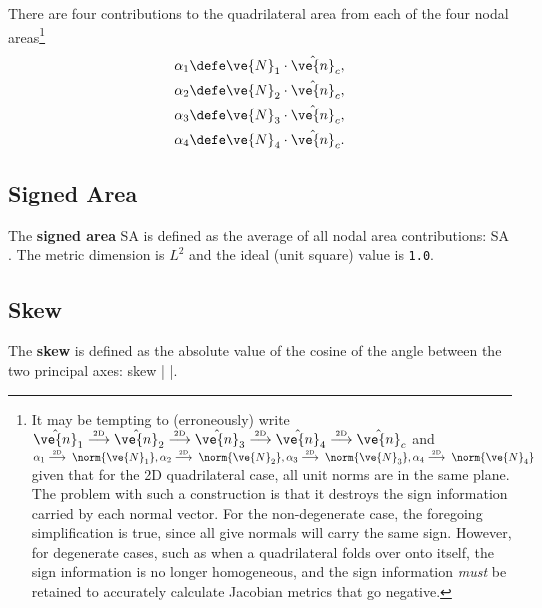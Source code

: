 \documentclass[14pt,letterpaper,fleqn]{extreport}
\begin{document}
There are four contributions to the quadrilateral area from each of the four nodal areas\footnote{\label{footnote:admonishment} It may be tempting to (erroneously) write
 $\hat{\ve{n}}_1 
 \overset{\tiny \mbox{2D}}{\longrightarrow}
 \hat{\ve{n}}_2 
 \overset{\tiny \mbox{2D}}{\longrightarrow}
 \hat{\ve{n}}_3 
 \overset{\tiny \mbox{2D}}{\longrightarrow}
 \hat{\ve{n}}_4
 \overset{\tiny \mbox{2D}}{\longrightarrow}
 \hat{\ve{n}}_c$
and
 $\alpha_1  \overset{\tiny \mbox{2D}}{\longrightarrow} \; \norm{\ve{N}_1}, 
 \alpha_2  \overset{\tiny \mbox{2D}}{\longrightarrow} \; \norm{\ve{N}_2},
 \alpha_3  \overset{\tiny \mbox{2D}}{\longrightarrow} \; \norm{\ve{N}_3},
 \alpha_4  \overset{\tiny \mbox{2D}}{\longrightarrow} \; \norm{\ve{N}_4}$
 given that for the 2D quadrilateral case, all unit norms are in the same plane.
 The problem with such a construction is that it destroys the sign information 
 carried by each normal vector.  
 For the non-degenerate case, the foregoing simplification is true, since all give normals
 will carry the same sign.  However, for degenerate cases, such as when a quadrilateral
 folds over onto itself, 
 the sign information is no longer homogeneous, and the sign information
 {\em must} be retained to accurately calculate Jacobian metrics that go negative.
}
\begin{align}
 \alpha_1 & \defe \ve{N}_1 \cdot \hat{\ve{n}}_c, \\
 \alpha_2 & \defe \ve{N}_2 \cdot \hat{\ve{n}}_c, \\
 \alpha_3 & \defe \ve{N}_3 \cdot \hat{\ve{n}}_c, \\
 \alpha_4 & \defe \ve{N}_4 \cdot \hat{\ve{n}}_c.
\end{align}
%

\subsection{Signed Area}
The {\bf signed area} SA is defined as the average of all nodal area contributions:
\be 
\mbox{SA}  \; .
\ee
The metric dimension is $L^2$ and the ideal (unit square) value is {\tt 1.0}.

\subsection{Skew}
The {\bf skew} is defined as the absolute value of the cosine of the angle
between the two principal axes:
\be
\mbox{skew}  \left| \; \frac{\vX}{\norm{\vX}} \cdot \frac{\vY}{\norm{\vY}} \; \right|.
\ee
\end{document}
